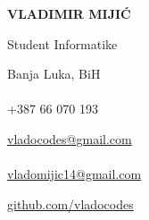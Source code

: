 \documentclass[9pt]{developercv} %
\begin{document}

\begin{minipage}[t]{0.45\textwidth}
	\vspace{-\baselineskip}
	
	{\Huge\textbf{\MakeUppercase{Vladimir Mijić}}}
	
	\vspace{6pt}
	
	{\huge Student Informatike}
\end{minipage}

\vspace{1cm}

\begin{minipage}[t]{0.3\textwidth}
    \vspace{-\baselineskip}
    
	{\faMapMarker \space}{Banja Luka, BiH}\\\\
	{\faPhone \space}{+387 66 070 193}\\
\end{minipage}
\hfill
\begin{minipage}[t]{0.3\textwidth}
	\vspace{-\baselineskip}
	
	{\faEnvelopeO \space}{\href{mailto:vladocodes@gmail.com}{vladocodes@gmail.com}}\\\\
	{\faEnvelopeO \space}{\href{mailto:vladomijic14@gmail.com}{vladomijic14@gmail.com}}\\
\end{minipage}
\hfill
\begin{minipage}[t]{0.3\textwidth}
	\vspace{-\baselineskip}
	
    {\faGithub \space}{\href{https://github.com/vladocodes}{github.com/vladocodes}}\\
\end{minipage}

\vspace{.5cm}



\end{document}
